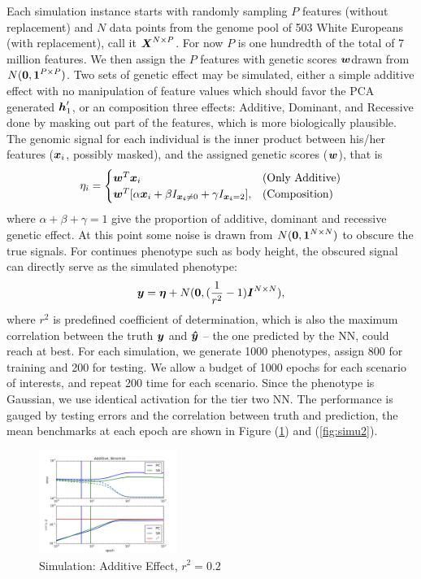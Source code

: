 \documentclass[acmtog, authorversion]{acmart}
\begin{document}
Each simulation instance starts with randomly sampling $P$ features (without replacement) and $N$ data points from the genome pool of 503 White Europeans (with replacement), call it $\boldsymbol{X}^{N \times P}$. For now $P$ is one hundredth of the total of 7 million features. We then assign the $P$ features with genetic scores $\boldsymbol{w} $drawn from $N(\boldsymbol{0}, \boldsymbol{1}^{P \times P})$. Two sets of genetic effect may be simulated, either a simple additive effect with no manipulation of feature values which should favor the PCA generated $\boldsymbol{h}_1^\prime$, or an composition three effects: Additive, Dominant, and Recessive done by masking out part of the features, which is more biologically plausible. The genomic signal for each individual is the inner product between his/her features ($\boldsymbol{x}_i$, possibly masked), and the assigned genetic scores ($\boldsymbol{w}$), that is
\begin{align*}
  \eta_i =
  \begin{cases}
    \boldsymbol{w}^T \boldsymbol{x}_i                                                                & \textrm{(Only Additive)} \\
    \boldsymbol{w}^T [\alpha\boldsymbol{x}_i + \beta I_{\boldsymbol{x_i} \ne 0}  + \gamma I_{\boldsymbol{x_i} = 2}], & \textrm{(Composition)}
  \end{cases}
\end{align*}
where $\alpha + \beta + \gamma = 1$ give the proportion of additive, dominant and recessive genetic effect.
At this point some noise is drawn from $N(\boldsymbol{0}, \boldsymbol{1}^{N \times N})$ to obscure the true signals. For continues phenotype such as body height, the obscured signal can directly serve as the simulated phenotype:
\begin{align*}
  \boldsymbol{y} = \boldsymbol{\eta} + N(\boldsymbol{0}, (\frac{1}{r^2} -1)\boldsymbol{I}^{N \times N}),
\end{align*}
where $r^2$ is predefined coefficient of determination, which is also the maximum correlation between the truth $\boldsymbol{y}$ and $\boldsymbol{\hat{y}}$ -- the one predicted by the NN, could reach at best. For each simulation, we generate 1000 phenotypes, assign 800 for training and 200 for testing. We allow a budget of 1000 epochs for each scenario of interests, and repeat 200 time for each scenario. Since the phenotype is Gaussian, we use identical activation for the tier two NN. The performance is gauged by testing errors and the correlation between truth and prediction, the mean benchmarks at each epoch are shown in Figure (\ref{fig:simu1}) and (\ref{fig:simu2}).
\begin{figure}[h]
  \centering
  \includegraphics[width=0.4\textwidth]{img/add_gsu}
  \caption{Simulation: Additive Effect, $r^2 = 0.2$ }
  \label{fig:simu1}
\end{figure}
\end{document}
